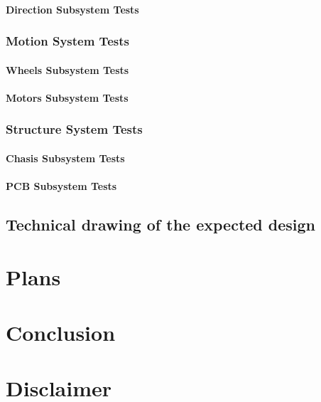 \documentclass[a4paper,12pt]{article}
\begin{document}
	\paragraph{Direction Subsystem Tests}


	\subsubsection{Motion System Tests}
	
	\paragraph{Wheels Subsystem Tests}	
		
	\paragraph{Motors Subsystem Tests}
	
	
	\subsubsection{Structure System Tests}
	
	\paragraph{Chasis Subsystem Tests}	
		
	\paragraph{PCB Subsystem Tests}
	
	
	\subsection{Technical drawing of the expected design}
	

\section{Plans}


\section{Conclusion}



\section{Disclaimer}
\end{document}
